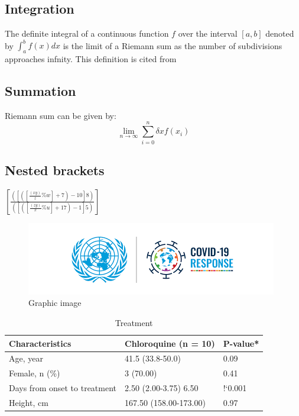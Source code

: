 \documentclass[10pt, a4paper]{article}
\begin{document}
	\subsection{Integration}
	The definite integral of a continuous function $f$ over the interval $[a,b]$ denoted by $\int_a^b f(x)dx$ is the limit of a Riemann sum as the number of subdivisions
	approaches infnity. This definition is cited from \cite{ghorpade2018course}
	\subsection{Summation}
	Riemann sum can be given by:
	$$\lim_{n\to\infty} \sum_{i=0}^{n} \delta xf(x_i)$$
	\subsection{Nested brackets}
	$\left[\frac{\left(\left[\left(\left[\frac{(xy)}{z} \% w\right] +7\right) -10\right]8\right)}{\left(\left[\left(\left[\frac{(zy)}{x} \% u\right] +17\right) -1\right]5\right)}\right]$
\newpage
\begin{figure}
	\centering    
	\includegraphics[scale=0.7]{covid}
	\caption{Graphic image}
	\label{fig:responce}
\end{figure}
\begin{table}
\begin{tabular}{|l|l|l|}
\hline
Characteristics & Chloroquine (n = 10) & P-value* \\ \hline\hline            
Age, year & 41.5 (33.8-50.0) & 0.09 \\ \hline      
Female, n (\%) & 3 (70.00) & 0.41 \\ \hline      
Days from onset to treatment & 2.50 (2.00-3.75) 6.50 & !`0.001 \\ \hline
Height, cm & 167.50 (158.00-173.00) & 0.97 \\ \hline
\end{tabular}
\caption{Treatment}
\label{tab:treat}
\end{table}
\end{document}
